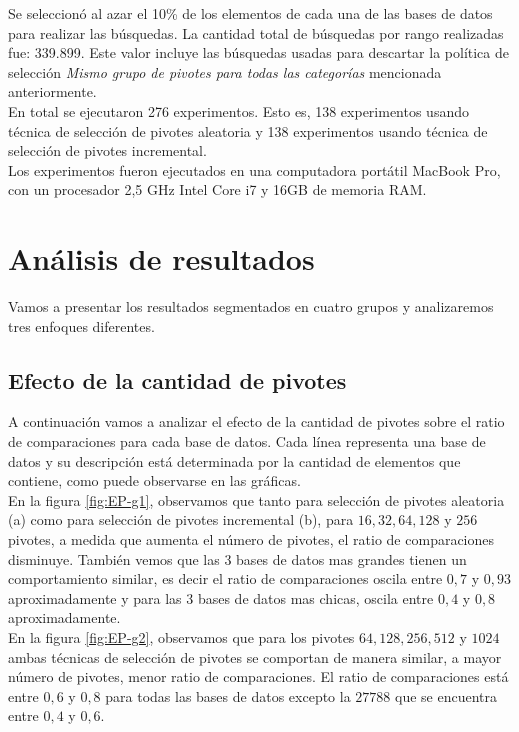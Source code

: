 Se seleccion\'o al azar el 10\% de los elementos de cada una de las bases de datos para realizar las b\'usquedas. La cantidad total de b\'usquedas por rango realizadas fue: 339.899. Este valor incluye las b\'usquedas usadas para descartar la pol\'itica de selecci\'on \textit{Mismo grupo de pivotes para todas las categor\'ias } mencionada anteriormente.\\

En total se ejecutaron 276 experimentos. Esto es, 138 experimentos usando t\'ecnica de selecci\'on de pivotes aleatoria y 138 experimentos usando t\'ecnica de selecci\'on de pivotes incremental.\\

Los experimentos fueron ejecutados en una computadora port\'atil MacBook Pro, con un procesador 2,5 GHz Intel Core i7 y 16GB de memoria RAM.

\section{An\'alisis de resultados}

Vamos a presentar los resultados segmentados en cuatro grupos y analizaremos tres enfoques diferentes.\\

\subsection{Efecto de la cantidad de pivotes}

A continuaci\'on vamos a analizar el efecto de la cantidad de pivotes sobre el ratio de comparaciones para cada base de datos. Cada l\'inea representa una base de datos y su descripci\'on est\'a determinada por la cantidad de elementos que contiene, como puede observarse en las gr\'aficas.\\

En la figura \ref{fig:EP-g1}, observamos que tanto para selecci\'on de pivotes aleatoria (a) como para selecci\'on de pivotes incremental (b), para $16, 32, 64, 128$ y $256$ pivotes, a medida que aumenta el n\'umero de pivotes, el ratio de comparaciones disminuye. Tambi\'en vemos que las 3 bases de datos mas grandes tienen un comportamiento similar, es decir el ratio de comparaciones oscila entre $0,7$ y $0,93$ aproximadamente y para las 3 bases de datos mas chicas, oscila entre $0,4$ y $0,8$ aproximadamente.\\

En la figura \ref{fig:EP-g2}, observamos que para los pivotes $64, 128, 256, 512$ y $1024$ ambas t\'ecnicas de selecci\'on de pivotes se comportan de manera similar, a mayor n\'umero de pivotes, menor ratio de comparaciones. El ratio de comparaciones est\'a entre $0,6$ y $0,8$ para todas las bases de datos excepto la $27788$ que se encuentra entre $0,4$ y $0,6$.\\

